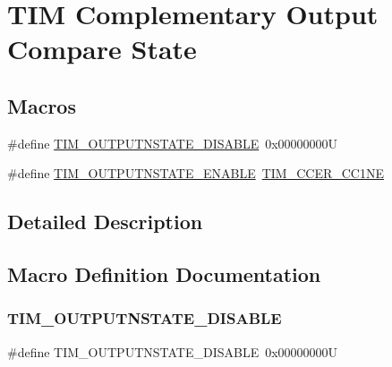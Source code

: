 \hypertarget{group___t_i_m___output___compare___n___state}{}\section{T\+IM Complementary Output Compare State}
\label{group___t_i_m___output___compare___n___state}
\subsection*{Macros}
\begin{DoxyCompactItemize}
\item 
\#define \hyperlink{group___t_i_m___output___compare___n___state_ga07bb7288fc4ed155301a3276908a23a0}{T\+I\+M\+\_\+\+O\+U\+T\+P\+U\+T\+N\+S\+T\+A\+T\+E\+\_\+\+D\+I\+S\+A\+B\+LE}~0x00000000U
\item 
\#define \hyperlink{group___t_i_m___output___compare___n___state_ga3323d8c81a7f3940aa290d160dea3e0d}{T\+I\+M\+\_\+\+O\+U\+T\+P\+U\+T\+N\+S\+T\+A\+T\+E\+\_\+\+E\+N\+A\+B\+LE}~\hyperlink{group___peripheral___registers___bits___definition_ga813056b3f90a13c4432aeba55f28957e}{T\+I\+M\+\_\+\+C\+C\+E\+R\+\_\+\+C\+C1\+NE}
\end{DoxyCompactItemize}


\subsection{Detailed Description}


\subsection{Macro Definition Documentation}
\mbox{\label{group___t_i_m___output___compare___n___state_ga07bb7288fc4ed155301a3276908a23a0}} 
\subsubsection{\texorpdfstring{T\+I\+M\+\_\+\+O\+U\+T\+P\+U\+T\+N\+S\+T\+A\+T\+E\+\_\+\+D\+I\+S\+A\+B\+LE}{TIM\_OUTPUTNSTATE\_DISABLE}}
{\footnotesize\ttfamily \#define T\+I\+M\+\_\+\+O\+U\+T\+P\+U\+T\+N\+S\+T\+A\+T\+E\+\_\+\+D\+I\+S\+A\+B\+LE~0x00000000U}


